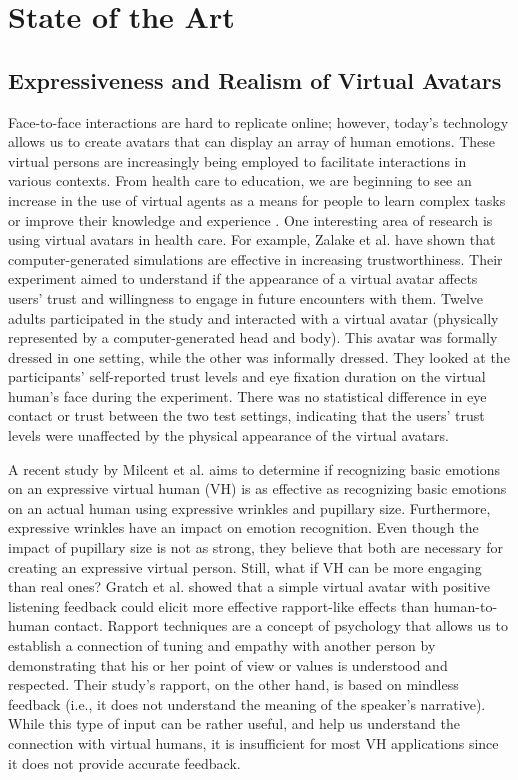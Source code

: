 \section{State of the Art}

\subsection{Expressiveness and Realism of Virtual Avatars}
Face-to-face interactions are hard to replicate online; however, today's technology allows us to create avatars that can display an array of human emotions. These virtual persons are increasingly being employed to facilitate interactions in various contexts. From health care to education, we are beginning to see an increase in the use of virtual agents as a means for people to learn complex tasks or improve their knowledge and experience \cite{MAR18, SHO19}. One interesting area of research is using virtual avatars in health care. For example, Zalake et al. \cite{ZAL18} have shown that computer-generated simulations are effective in increasing trustworthiness. Their experiment aimed to understand if the appearance of a virtual avatar affects users' trust and willingness to engage in future encounters with them. Twelve adults participated in the study and interacted with a virtual avatar (physically represented by a computer-generated head and body). This avatar was formally dressed in one setting, while the other was informally dressed. They looked at the participants' self-reported trust levels and eye fixation duration on the virtual human's face during the experiment. There was no statistical difference in eye contact or trust between the two test settings, indicating that the users' trust levels were unaffected by the physical appearance of the virtual avatars.

A recent study by Milcent et al. \cite{MIL19} aims to determine if recognizing basic emotions on an expressive virtual human (VH) is as effective as recognizing basic emotions on an actual human using expressive wrinkles and pupillary size. Furthermore, expressive wrinkles have an impact on emotion recognition. Even though the impact of pupillary size is not as strong, they believe that both are necessary for creating an expressive virtual person. 
Still, what if VH can be more engaging than real ones? Gratch et al. \cite{GRA07} showed that a simple virtual avatar with positive listening feedback could elicit more effective rapport-like effects than human-to-human contact. Rapport techniques are a concept of psychology that allows us to establish a connection of tuning and empathy with another person by demonstrating that his or her point of view or values is understood and respected. Their study's rapport, on the other hand, is based on mindless feedback (i.e., it does not understand the meaning of the speaker's narrative). While this type of input can be rather useful, and help us understand the connection with virtual humans, it is insufficient for most VH applications since it does not provide accurate feedback.

